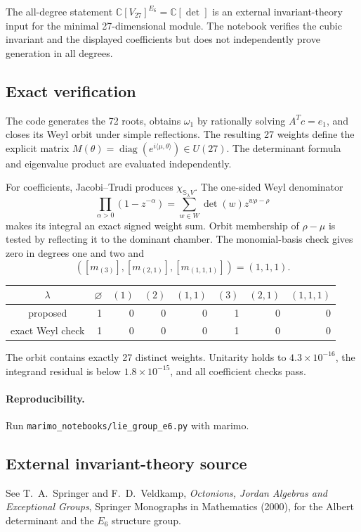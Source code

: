 \documentclass[10pt]{article}
\begin{document}
The all-degree statement $\mathbb C[V_{27}]^{E_6}=\mathbb C[\det]$ is an
external invariant-theory input for the minimal 27-dimensional module.  The
notebook verifies the cubic invariant and the displayed coefficients but does
not independently prove generation in all degrees.

\subsection{Exact verification}
The code generates the 72 roots, obtains $\omega_1$ by rationally solving
$A^Tc=e_1$, and closes its Weyl orbit under simple reflections.  The resulting
27 weights define the explicit matrix
$M(\theta)=\operatorname{diag}(e^{i\langle\mu,\theta\rangle})\in U(27)$.
The determinant formula and eigenvalue product are evaluated independently.

For coefficients, Jacobi--Trudi produces $\chi_{\mathbb S_\lambda V}$.
The one-sided Weyl denominator
\[
 \prod_{\alpha>0}(1-z^{-\alpha})=
 \sum_{w\in W}\det(w)z^{w\rho-\rho}
\]
makes its integral an exact signed weight sum.  Orbit membership of
$\rho-\mu$ is tested by reflecting it to the dominant chamber.
The monomial-basis check gives zero in degrees one and two and
\[
([m_{(3)}],[m_{(2,1)}],[m_{(1,1,1)}])=(1,1,1).
\]

\begin{center}\small
\begin{tabular}{@{}c|rrrrrrr@{}}\toprule
$\lambda$&$\varnothing$&$(1)$&$(2)$&$(1,1)$&$(3)$&$(2,1)$&$(1,1,1)$\\\midrule
proposed&1&0&0&0&1&0&0\\
exact Weyl check&1&0&0&0&1&0&0\\\bottomrule
\end{tabular}
\end{center}
The orbit contains exactly 27 distinct weights.  Unitarity holds to
$4.3\times10^{-16}$, the integrand residual is below $1.8\times10^{-15}$,
and all coefficient checks pass.

\paragraph{Reproducibility.} Run \texttt{marimo\_notebooks/lie\_group\_e6.py} with marimo.
\subsection*{External invariant-theory source}
See T.~A.~Springer and F.~D.~Veldkamp, \emph{Octonions, Jordan Algebras and
Exceptional Groups}, Springer Monographs in Mathematics (2000), for the
Albert determinant and the $E_6$ structure group.
\endgroup
\end{document}
